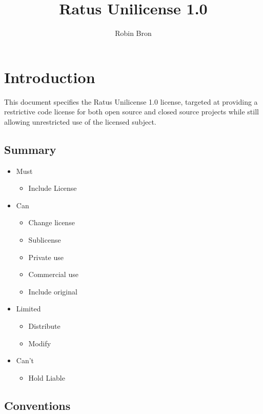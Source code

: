 \documentclass[a4paper,11pt]{article}
\begin{document}
\title{Ratus Unilicense 1.0}
\author{Robin Bron}
\date{}
\maketitle

\vfill


\newpage
\tableofcontents
\newpage

\section{Introduction}
  This document specifies the Ratus Unilicense 1.0 license, targeted at
  providing a restrictive code license for both open source and closed source
  projects while still allowing unrestricted use of the licensed subject.

\subsection{Summary}
  \begin{itemize}
    \item Must
    \begin{itemize}
      \item Include License
    \end{itemize}
    \item Can
    \begin{itemize}
      \item Change license
      \item Sublicense
      \item Private use
      \item Commercial use
      \item Include original
    \end{itemize}
    \item Limited
    \begin{itemize}
      \item Distribute
      \item Modify
    \end{itemize}
    \item Can't
    \begin{itemize}
      \item Hold Liable
    \end{itemize}
  \end{itemize}

\subsection{Conventions}

\end{document}
